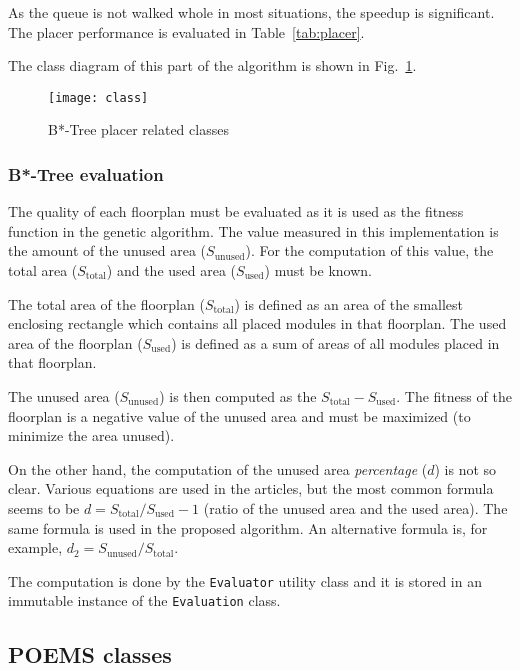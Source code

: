 As the queue is not walked whole in most situations, the speedup is significant. The placer performance is evaluated in Table~\ref{tab:placer}.

The class diagram of this part of the algorithm is shown in Fig.~\ref{fig:uml:placer}.

\begin{figure}
\centering
\texttt{[image: class]}
\caption{B*-Tree placer related classes}
\label{fig:uml:placer}
\end{figure}

\subsubsection{B*-Tree evaluation}

The quality of each floorplan must be evaluated as it is used as the fitness function in the genetic algorithm. The value measured in this implementation is the amount of the unused area ($S_{\mathrm{unused}}$). For the computation of this value, the total area ($S_{\mathrm{total}}$) and the used area ($S_{\mathrm{used}}$) must be known. 

The total area of the floorplan ($S_{\mathrm{total}}$) is defined as an area of the smallest enclosing rectangle which contains all placed modules in that floorplan. The used area of the floorplan ($S_{\mathrm{used}}$) is defined as a sum of areas of all modules placed in that floorplan. 

The unused area ($S_{\mathrm{unused}}$) is then computed as the $ S_{\mathrm{total}} - S_{\mathrm{used}}$. The fitness of the floorplan is a negative value of the unused area and must be maximized (to minimize the area unused).

On the other hand, the computation of the unused area {\em percentage} ($d$) is not so clear. Various equations are used in the articles, but the most common formula seems to be $d = S_{\mathrm{total}} / S_{\mathrm{used}} - 1 $ (ratio of the unused area and the used area). The same formula is used in the proposed algorithm. An alternative formula is, for example, $d_2 = S_{\mathrm{unused}} / S_{\mathrm{total}}$.

The computation is done by the {\tt Evaluator} utility class and it is stored in an immutable instance of the {\tt Evaluation} class.

\subsection{POEMS classes}

